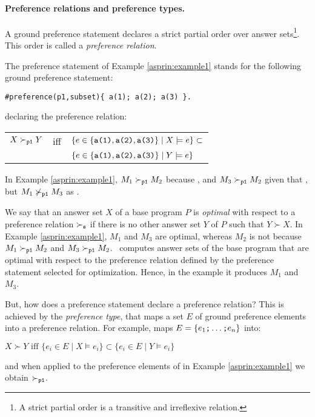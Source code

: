 \paragraph{Preference relations and preference types.}
A ground preference statement declares a 
strict partial order over answer sets\footnote{A strict partial order is a transitive and irreflexive relation.}.
This order is called a \emph{preference relation}.
\begin{example}
The preference statement of Example \ref{asprin:example1} stands for the following ground preference statement:
\begin{lstlisting}[numbers=none]
#preference(p1,subset){ a(1); a(2); a(3) }.
\end{lstlisting}
declaring the preference relation:
\begin{center}
\begin{tabular}{ccl}
$X \succ_{\texttt{p1}} Y$ & iff & $\{e\in \{\texttt{a(1)},\texttt{a(2)},\texttt{a(3)}\} \mid X\models e\}\subset$ \\ 
                       &      & $\{e\in \{\texttt{a(1)},\texttt{a(2)},\texttt{a(3)}\} \mid Y\models e\}$
\end{tabular}
\end{center}
In Example \ref{asprin:example1}, 
$M_1\succ_{\texttt{p1}}M_2$ because , 
and $M_3\succ_{\texttt{p1}}M_2$ given that , 
but  $M_1\not\succ_{\texttt{p1}}M_3$ as . 
\end{example}
We say that an answer set $X$ of a base program $P$ is \emph{optimal} with respect to a preference relation $\succ_{\texttt{s}}$
if there is no other answer set $Y$ of $P$ such that $Y \succ X$.
In Example \ref{asprin:example1}, 
$M_1$ and $M_3$ are optimal,
whereas $M_2$ is not because $M_1 \succ_{\texttt{p1}} M_2$ and $M_3 \succ_{\texttt{p1}} M_2$. 
\asprin\ computes answer sets of the base program
that are optimal with respect to the preference relation 
defined by the preference statement selected for optimization.
Hence, in the example it produces $M_1$ and $M_3$.

But, how does a preference statement declare a preference relation?
This is achieved by the \emph{preference type}, 
that maps a set $E$ of ground preference elements into a preference relation.
For example,  maps $E=\{e_1\texttt{;}\ldots\texttt{;}e_n\}$ into:
\begin{center}
\(
X \succ Y \text{ iff } \{e_i\in E\mid X\models e_i\}\subset\{e_i\in E\mid Y\models e_i\}
\)
\end{center}
and when applied to the preference elements of  in Example \ref{asprin:example1} we obtain $\succ_{\texttt{p1}}$.

